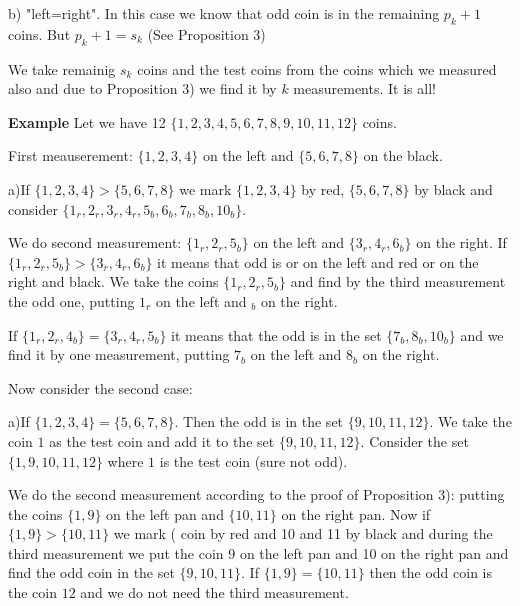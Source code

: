       b) "left=right". In this case we know that odd coin is
      in the remaining $p_k+1$ coins. But $p_k+1=s_k$ (See Proposition 3)

          We take remainig $s_k$ coins and the test coins from
          the coins which we measured also and due to Proposition 3)
          we find it by $k$ measurements.
                 \bigskip
                    It is all!

     {\bf Example} Let we have 12  $\{1,2,3,4,5,6,7,8,9,10,11,12\}$ coins.

    First meauserement:
      $\{1,2,3,4\}$ on the left and $\{5,6,7,8\}$ on the black.

           \medskip

     a)If $\{1,2,3,4\}>\{5,6,7,8\}$ we mark $\{1,2,3,4\}$ by red, $\{5,6,7,8\}$
   by black and consider $\{1_r,2_r,3_r,4_r,5_b,6_b,7_b,8_b,10_b\}$.

     We do second measurement:
       $\{1_r,2_r,5_b\}$ on the left and $\{3_r,4_r,6_b\}$
   on the right.
   If $\{1_r,2_r,5_b\}>\{3_r,4_r,6_b\}$ it means that
   odd is or on the left and red or on the right and black.
   We take the coins
   $\{1_r,2_r,5_b\}$ and find by the third measurement
    the odd one, putting $1_r$ on the left and $_b$ on the right.

    If $\{1_r,2_r,4_b\}=\{3_r,4_r,5_b\}$ it means that
    the odd is in the set $\{7_b,8_b,10_b\}$ and we
    find it by one measurement,
    putting $7_b$ on the left and $8_b$ on the right.

  Now consider the second case:

   \medskip
   a)If $\{1,2,3,4\}=\{5,6,7,8\}$. Then the odd is in the set
    $\{9,10,11,12\}$. We take the coin $1$ as the test coin and add it to
    the set $\{9,10,11,12\}$. Consider the set $\{1,9,10,11,12\}$
    where $1$ is the test coin (sure not odd).

     We do the second measurement according to the proof of Proposition 3):
     putting the coins $\{1,9\}$ on the left pan and
     $\{10,11\}$ on the right pan.
    Now if $\{1,9\}>\{10,11\}$ we mark ( coin by red and 10 and 11 by black
     and during the third measurement we
     put the coin 9 on the left pan and 10 on the right pan
     and find the odd coin in the set $\{9,10,11\}$.
   If $\{1,9\}=\{10,11\}$ then the odd coin is the coin $12$
   and we do not need the third measurement.


  \bye
